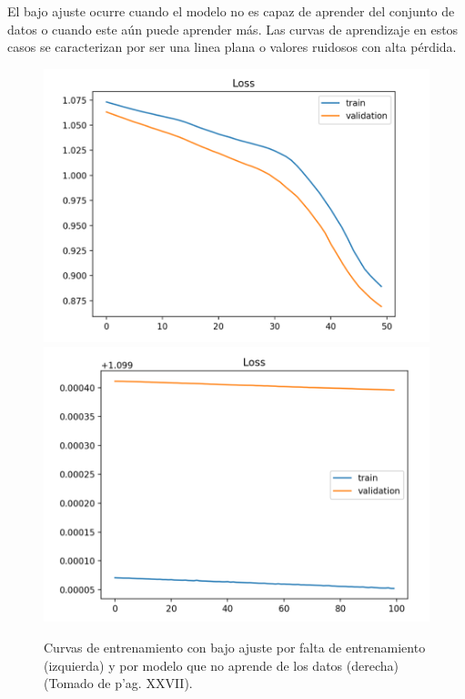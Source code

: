 El bajo ajuste ocurre cuando el modelo no es capaz de aprender del conjunto de datos o cuando este aún puede aprender 
más. Las curvas de aprendizaje en estos casos se caracterizan por ser una linea plana o valores ruidosos con alta pérdida.

\begin{figure}[h!]
	\begin{center}
		\begin{center}
			\includegraphics[scale=.3]{Graphics/underfit_missing_training.png}
			\includegraphics[scale=.3]{Graphics/underfit_not_learning.png}
        \end{center}
	    \caption{Curvas de entrenamiento con bajo ajuste por falta de entrenamiento (izquierda) 
		y por modelo que no aprende de los datos (derecha) (Tomado de \cite{brownlee2018better} p'ag. XXVII).}\label{fig:underfit}
	\end{center}
\end{figure}

